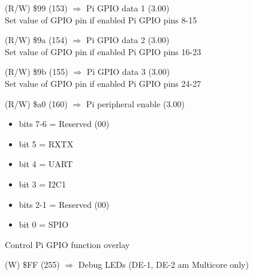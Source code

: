 (R/W) \$99 (153) $\Rightarrow$ Pi GPIO data 1 (3.00)\\
Set value of GPIO pin if enabled Pi GPIO pins 8-15

(R/W) \$9a (154) $\Rightarrow$ Pi GPIO data 2 (3.00)\\
Set value of GPIO pin if enabled Pi GPIO pins 16-23

(R/W) \$9b (155) $\Rightarrow$ Pi GPIO data 3 (3.00)\\
Set value of GPIO pin if enabled Pi GPIO pins 24-27

(R/W) \$a0 (160) $\Rightarrow$ Pi peripheral enable (3.00)
\begin{itemize}
\item[] bits 7-6 = Reserved (00)
\item[] bit 5 = RXTX
\item[] bit 4 = UART
\item[] bit 3 = I2C1
\item[] bits 2-1 = Reserved (00)
\item[] bit 0 = SPIO
\end{itemize}
Control Pi GPIO function overlay

(W) \$FF (255) $\Rightarrow$ Debug LEDs (DE-1, DE-2 am Multicore only)
